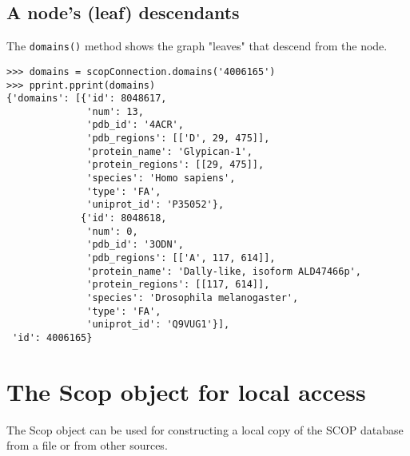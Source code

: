 \subsection{A node's (leaf) descendants}

The \verb|domains()| method shows the graph "leaves" that descend from the node.

\begin{verbatim}
>>> domains = scopConnection.domains('4006165')
>>> pprint.pprint(domains)
{'domains': [{'id': 8048617,
              'num': 13,
              'pdb_id': '4ACR',
              'pdb_regions': [['D', 29, 475]],
              'protein_name': 'Glypican-1',
              'protein_regions': [[29, 475]],
              'species': 'Homo sapiens',
              'type': 'FA',
              'uniprot_id': 'P35052'},
             {'id': 8048618,
              'num': 0,
              'pdb_id': '3ODN',
              'pdb_regions': [['A', 117, 614]],
              'protein_name': 'Dally-like, isoform ALD47466p',
              'protein_regions': [[117, 614]],
              'species': 'Drosophila melanogaster',
              'type': 'FA',
              'uniprot_id': 'Q9VUG1'}],
 'id': 4006165}
\end{verbatim}

\section{The Scop object for local access}
\label{sec:ScopObject}

The Scop object can be used for constructing a local copy of the SCOP database from a file or from other sources.
